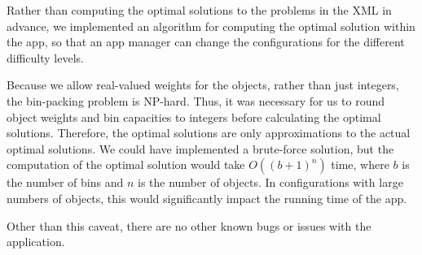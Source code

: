 \documentclass[11pt]{article}
\begin{document}
Rather than computing the optimal solutions to the problems in the XML
in advance, we implemented an algorithm for computing the optimal solution
within the app, so that an app manager can change the configurations for the
different difficulty levels.

Because we allow real-valued weights for the
objects, rather than just integers, the bin-packing problem is NP-hard.  Thus,
it was necessary for us to round object weights and bin capacities to integers
before calculating the optimal solutions.  Therefore, the optimal solutions are
only approximations to the actual optimal solutions.  We could have implemented
a brute-force solution, but the computation of the optimal solution would take
$O((b+1)^n)$ time, where $b$ is the number of bins and $n$ is the number of
objects.  In configurations with large numbers of objects, this would
significantly impact the running time of the app.

Other than this caveat, there are no other known bugs or issues with the
application.
\end{document}
